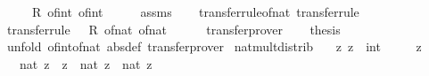 \begin{isabellebody}
\ \ \ {\isachardoublequoteopen}{\isacharparenleft}{\kern0pt}{\isacharparenleft}{\kern0pt}{\isacharequal}{\kern0pt}{\isacharparenright}{\kern0pt}\ {\isacharequal}{\kern0pt}{\isacharequal}{\kern0pt}{\isacharequal}{\kern0pt}{\isachargreater}{\kern0pt}\ R{\isacharparenright}{\kern0pt}\ of{\isacharunderscore}{\kern0pt}int\ of{\isacharunderscore}{\kern0pt}int{\isachardoublequoteclose}\isanewline
%
\isadelimproof
%
\endisadelimproof
%
\isatagproof
{}\isamarkupfalse%
\ {\isacharminus}{\kern0pt}\isanewline
\ \ \isamarkupfalse%
\ assms\isanewline
\ \ \isamarkupfalse%
\ transfer{\isacharunderscore}{\kern0pt}rule{\isacharunderscore}{\kern0pt}of{\isacharunderscore}{\kern0pt}nat\ {\isacharbrackleft}{\kern0pt}transfer{\isacharunderscore}{\kern0pt}rule{\isacharbrackright}{\kern0pt}\isanewline
\ \ \isamarkupfalse%
\ {\isacharbrackleft}{\kern0pt}transfer{\isacharunderscore}{\kern0pt}rule{\isacharbrackright}{\kern0pt}{\isacharcolon}{\kern0pt}\ {\isachardoublequoteopen}{\isacharparenleft}{\kern0pt}{\isacharparenleft}{\kern0pt}{\isacharequal}{\kern0pt}{\isacharparenright}{\kern0pt}\ {\isacharequal}{\kern0pt}{\isacharequal}{\kern0pt}{\isacharequal}{\kern0pt}{\isachargreater}{\kern0pt}\ R{\isacharparenright}{\kern0pt}\ of{\isacharunderscore}{\kern0pt}nat\ of{\isacharunderscore}{\kern0pt}nat{\isachardoublequoteclose}\isanewline
\ \ \ \ \isamarkupfalse%
\ transfer{\isacharunderscore}{\kern0pt}prover\isanewline
\ \ \isamarkupfalse%
\ {\isacharquery}{\kern0pt}thesis\isanewline
\ \ \ \ \isamarkupfalse%
\ {\isacharparenleft}{\kern0pt}unfold\ of{\isacharunderscore}{\kern0pt}int{\isacharunderscore}{\kern0pt}of{\isacharunderscore}{\kern0pt}nat\ {\isacharbrackleft}{\kern0pt}abs{\isacharunderscore}{\kern0pt}def{\isacharbrackright}{\kern0pt}{\isacharparenright}{\kern0pt}\ transfer{\isacharunderscore}{\kern0pt}prover\isanewline
{}\isamarkupfalse%
%
\endisatagproof
{\isafoldproof}%
%
\isadelimproof
\isanewline
%
\endisadelimproof
\isanewline
{}\isamarkupfalse%
\ nat{\isacharunderscore}{\kern0pt}mult{\isacharunderscore}{\kern0pt}distrib{\isacharcolon}{\kern0pt}\isanewline
\ \ \ z\ z{\isacharprime}{\kern0pt}\ {\isacharcolon}{\kern0pt}{\isacharcolon}{\kern0pt}\ int\isanewline
\ \ \ {\isachardoublequoteopen}{}\ {\isasymle}\ z{\isachardoublequoteclose}\isanewline
\ \ \ {\isachardoublequoteopen}nat\ {\isacharparenleft}{\kern0pt}z\ {\isacharasterisk}{\kern0pt}\ z{\isacharprime}{\kern0pt}{\isacharparenright}{\kern0pt}\ {\isacharequal}{\kern0pt}\ nat\ z\ {\isacharasterisk}{\kern0pt}\ nat\ z{\isacharprime}{\kern0pt}{\isachardoublequoteclose}\isanewline

\end{isabellebody}
